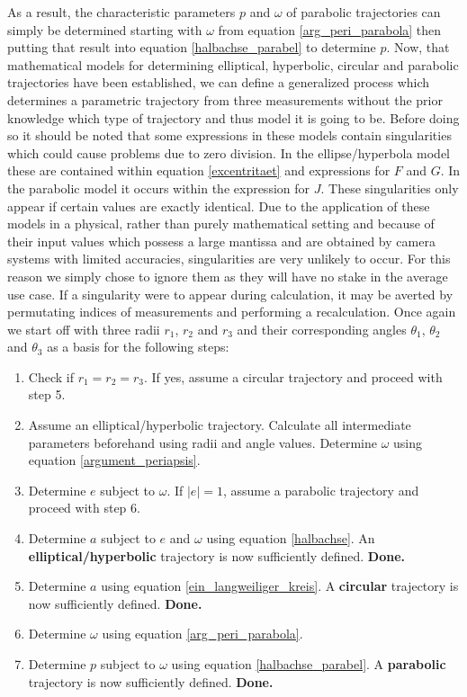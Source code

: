 \documentclass[11pt,a4paper]{article}
\begin{document}
	As a result, the characteristic parameters $p$ and $\omega$ of parabolic trajectories can simply be determined starting with $\omega$ from equation \ref{arg_peri_parabola} then putting that result into equation \ref{halbachse_parabel} to determine $p$.\newline
	Now, that mathematical models for determining elliptical, hyperbolic, circular and parabolic trajectories have been established, we can define a generalized process which determines a parametric trajectory from three measurements without the prior knowledge which type of trajectory and thus model it is going to be. \newline Before doing so it should be noted that some expressions in these models contain singularities which could cause problems due to zero division. In the ellipse/hyperbola model these are contained within equation \ref{excentritaet} and expressions for $F$ and $G$. In the parabolic model it occurs within the expression for $J$. These singularities only appear if certain values are exactly identical. Due to the application of these models in a physical, rather than purely mathematical setting and because of their input values which possess a large mantissa and are obtained by camera systems with limited accuracies, singularities are very unlikely to occur. For this reason we simply chose to ignore them as they will have no stake in the average use case. If a singularity were to appear during calculation, it may be averted by permutating indices of measurements and performing a recalculation. \newline
	Once again we start off with three radii $r_1$, $r_2$ and $r_3$ and their corresponding angles $\theta_1$, $\theta_2$ and $\theta_3$ as a basis for the following steps:
	\begin{enumerate}
		\item Check if $r_1=r_2=r_3$. If yes, assume a circular trajectory and proceed with step 5.
		\item Assume an elliptical/hyperbolic trajectory. Calculate all intermediate parameters beforehand using radii and angle values. Determine $\omega$ using equation \ref{argument_periapsis}.
		\item Determine $e$ subject to $\omega$. If $|e|=1$, assume a parabolic trajectory and proceed with step 6.
		\item Determine $a$ subject to $e$ and $\omega$ using equation \ref{halbachse}. An \textbf{elliptical/hyperbolic} trajectory is now sufficiently defined. \newline\textbf{Done.}
		\item Determine $a$ using equation \ref{ein_langweiliger_kreis}. A \textbf{circular} trajectory is now sufficiently defined. \newline\textbf{Done.}
		\item Determine $\omega$ using equation \ref{arg_peri_parabola}.
		\item Determine $p$ subject to $\omega$ using equation \ref{halbachse_parabel}. A \textbf{parabolic} trajectory is now sufficiently defined. \newline\textbf{Done.}
	\end{enumerate}
	
\end{document}
